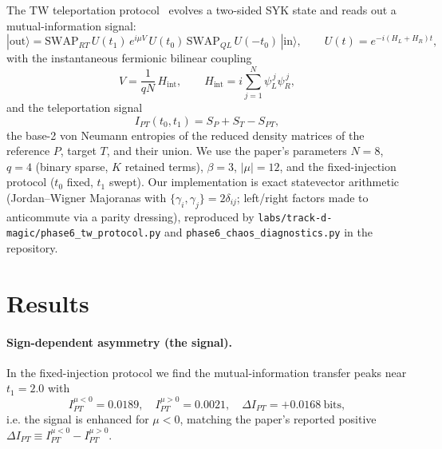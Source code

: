 \documentclass[11pt]{article}
\newcommand{\IPT}{I_{PT}}
\newcommand{\dIPT}{\Delta I_{PT}}
\begin{document}
The TW teleportation protocol~\cite{bkl,maldacenaqi,gjw} evolves a two-sided SYK
state and reads out a mutual-information signal:
\begin{equation}
  |\text{out}\rangle = \mathrm{SWAP}_{RT}\, U(t_1)\, e^{i\mu V}\, U(t_0)\,
  \mathrm{SWAP}_{QL}\, U(-t_0)\, |\text{in}\rangle,
  \qquad U(t)=e^{-i(H_L+H_R)t},
\end{equation}
with the instantaneous fermionic bilinear coupling
\begin{equation}
  V = \frac{1}{qN}\,H_{\text{int}}, \qquad
  H_{\text{int}} = i\sum_{j=1}^{N}\psi_L^{\,j}\psi_R^{\,j},
\end{equation}
and the teleportation signal
\begin{equation}
  \IPT(t_0,t_1) = S_P + S_T - S_{PT},
\end{equation}
the base-2 von Neumann entropies of the reduced density matrices of the
reference $P$, target $T$, and their union. We use the paper's parameters
$N=8$, $q=4$ (binary sparse, $K$ retained terms), $\beta=3$, $|\mu|=12$, and the
fixed-injection protocol ($t_0$ fixed, $t_1$ swept). Our implementation is exact
statevector arithmetic (Jordan--Wigner Majoranas with
$\{\gamma_i,\gamma_j\}=2\delta_{ij}$; left/right factors made to anticommute via
a parity dressing), reproduced by \texttt{labs/track-d-magic/phase6\_tw\_protocol.py}
and \texttt{phase6\_chaos\_diagnostics.py} in the repository.

\section{Results}

\paragraph{Sign-dependent asymmetry (the signal).} In the fixed-injection
protocol we find the mutual-information transfer peaks near $t_1=2.0$ with
\begin{equation}
  \IPT^{\mu<0} = 0.0189, \quad \IPT^{\mu>0} = 0.0021, \quad
  \dIPT = +0.0168 \ \text{bits},
\end{equation}
i.e. the signal is enhanced for $\mu<0$, matching the paper's reported positive
$\dIPT \equiv \IPT^{\mu<0}-\IPT^{\mu>0}$.
\end{document}
